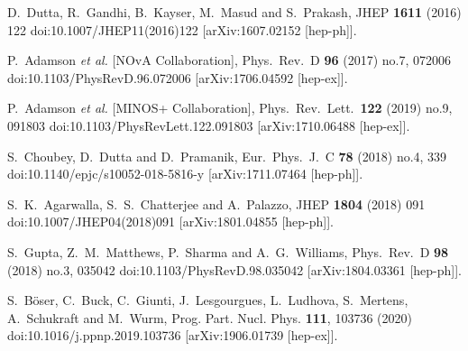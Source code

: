 \begin{thebibliography}{00}
  D.~Dutta, R.~Gandhi, B.~Kayser, M.~Masud and S.~Prakash,
  JHEP {\bf 1611} (2016) 122
  doi:10.1007/JHEP11(2016)122
  [arXiv:1607.02152 [hep-ph]].

  
  P.~Adamson {\it et al.} [NOvA Collaboration],
  Phys.\ Rev.\ D {\bf 96} (2017) no.7,  072006
  doi:10.1103/PhysRevD.96.072006
  [arXiv:1706.04592 [hep-ex]].
  
  P.~Adamson {\it et al.} [MINOS+ Collaboration],
  Phys.\ Rev.\ Lett.\  {\bf 122} (2019) no.9,  091803
  doi:10.1103/PhysRevLett.122.091803
  [arXiv:1710.06488 [hep-ex]].

  
  S.~Choubey, D.~Dutta and D.~Pramanik,
  Eur.\ Phys.\ J.\ C {\bf 78} (2018) no.4,  339
  doi:10.1140/epjc/s10052-018-5816-y
  [arXiv:1711.07464 [hep-ph]].
  
  
  S.~K.~Agarwalla, S.~S.~Chatterjee and A.~Palazzo,
  JHEP {\bf 1804} (2018) 091
  doi:10.1007/JHEP04(2018)091
  [arXiv:1801.04855 [hep-ph]].

  S.~Gupta, Z.~M.~Matthews, P.~Sharma and A.~G.~Williams,
  Phys.\ Rev.\ D {\bf 98} (2018) no.3,  035042
  doi:10.1103/PhysRevD.98.035042
  [arXiv:1804.03361 [hep-ph]].
  
S.~B\"oser, C.~Buck, C.~Giunti, J.~Lesgourgues, L.~Ludhova, S.~Mertens, A.~Schukraft and M.~Wurm,
Prog. Part. Nucl. Phys. \textbf{111}, 103736 (2020)
doi:10.1016/j.ppnp.2019.103736
[arXiv:1906.01739 [hep-ex]].


\end{thebibliography}
